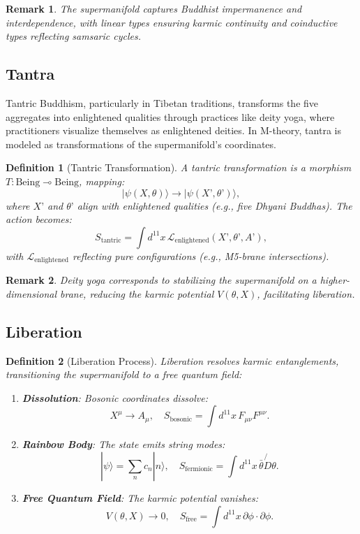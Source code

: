 \documentclass{article}
\newtheorem{definition}{Definition}
\newtheorem{remark}{Remark}
\begin{document}
\begin{remark}
The supermanifold captures Buddhist impermanence and interdependence, with linear types ensuring karmic continuity and coinductive types reflecting samsaric cycles.
\end{remark}

\subsection{Tantra}
\label{sec:tantra}
Tantric Buddhism, particularly in Tibetan traditions, transforms the five aggregates into enlightened qualities through practices like deity yoga, where practitioners visualize themselves as enlightened deities. In M-theory, tantra is modeled as transformations of the supermanifold’s coordinates.

\begin{definition}[Tantric Transformation]
\label{def:tantra}
A tantric transformation is a morphism \( T: \text{Being} \multimap \text{Being} \), mapping:
\[
|\psi(X, \theta)\rangle \to |\psi(X’, \theta’)\rangle,
\]
where \( X’ \) and \( \theta’ \) align with enlightened qualities (e.g., five Dhyani Buddhas). The action becomes:
\[
S_{\text{tantric}} = \int d^{11}x \, \mathcal{L}_{\text{enlightened}}(X’, \theta’, A’),
\]
with \( \mathcal{L}_{\text{enlightened}} \) reflecting pure configurations (e.g., M5-brane intersections).
\end{definition}

\begin{remark}
Deity yoga corresponds to stabilizing the supermanifold on a higher-dimensional brane, reducing the karmic potential \( V(\theta, X) \), facilitating liberation.
\end{remark}

\subsection{Liberation}
\label{sec:liberation}

\begin{definition}[Liberation Process]
\label{def:liberation}
Liberation resolves karmic entanglements, transitioning the supermanifold to a free quantum field:
\begin{enumerate}
    \item \textbf{Dissolution}: Bosonic coordinates dissolve:
    \[
    X^\mu \to A_\mu, \quad S_{\text{bosonic}} = \int d^{11}x \, F_{\mu\nu} F^{\mu\nu}.
    \]
    \item \textbf{Rainbow Body}: The state emits string modes:
    \[
    |\psi\rangle = \sum_n c_n |n\rangle, \quad S_{\text{fermionic}} = \int d^{11}x \, \bar{\theta} \not{D} \theta.
    \]
    \item \textbf{Free Quantum Field}: The karmic potential vanishes:
    \[
    V(\theta, X) \to 0, \quad S_{\text{free}} = \int d^{11}x \, \partial \phi \cdot \partial \phi.
    \]
\end{enumerate}
\end{definition}
\end{document}
